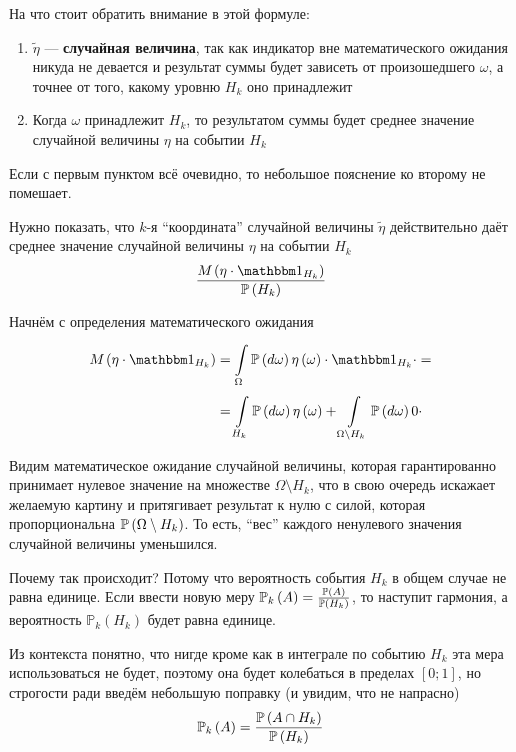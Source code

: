 На что стоит обратить внимание в этой формуле:
\begin{enumerate}
    \item $\tilde{\eta}$ --- \textbf{случайная величина},
        так как индикатор вне математического ожидания никуда не девается
        и результат суммы будет зависеть от произошедшего $\omega$,
        а точнее от того, какому уровню $H_k$ оно принадлежит
    \item Когда $\omega$ принадлежит $H_k$,
        то результатом суммы будет среднее значение случайной величины $\eta$
        на событии $H_k$
\end{enumerate}

Если с первым пунктом всё очевидно,
то небольшое пояснение ко второму не помешает.

Нужно показать, что $k$-я ``координата'' случайной величины $\tilde{\eta}$
действительно даёт среднее значение случайной величины $\eta$ на событии $H_k$
$$\frac{\mean{\left( \eta \cdot \indicatorof{H_k} \right)}}{\probability{H_k}}$$

Начнём с определения математического ожидания
\begin{equation}\label{meanIndicator}
    \begin{aligned}
    \mean{\left( \eta \cdot \indicatorof{H_k} \right)}
        &=\integralc{\Omega}{}{}{\probability{d\omega}}{
            \eta\left( \omega \right) \cdot \indicatorof{H_k}\cdot} =\\
        &=\integralc{H_k}{}{}{\probability{d\omega}}{
            \eta\left( \omega \right)}
            + \integralc{\Omega \setminus H_k}{}{}{
                \probability{d\omega}}{0 \cdot}
    \end{aligned}
\end{equation}

Видим математическое ожидание случайной величины,
которая гарантированно принимает нулевое значение
на множестве $\Omega \setminus H_k$,
что в свою очередь искажает желаемую картину и притягивает результат к нулю
с силой, которая пропорциональна $\mathbb{P}\left( \Omega \setminus H_k \right)$.
То есть, ``вес'' каждого ненулевого значения случайной величины уменьшился.

Почему так происходит?
Потому что вероятность события $H_k$ в общем случае не равна единице.
Если ввести новую меру
$\mathbb{P}_k\left( A \right)=\frac{\mathbb{P}\left( A \right)}{\mathbb{P}\left( H_k \right)}$,
то наступит гармония, а
вероятность $\mathbb{P}_k\left( H_k \right)$ будет равна единице.

Из контекста понятно, что нигде кроме как в интеграле по событию $H_k$ эта
мера использоваться не будет,
поэтому она будет колебаться в пределах $\left[ 0;1 \right]$,
но строгости ради введём небольшую поправку (и увидим, что не напрасно)
$$\mathbb{P}_k\left( A \right)
    =\frac{\mathbb{P}\left( A\cap H_k \right)}{\mathbb{P}\left( H_k \right)}$$

